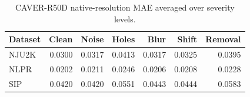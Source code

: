 \begin{table}[t]\centering\caption{CAVER-R50D native-resolution MAE averaged over severity levels.}\label{tab:caver_family_mae}\begin{tabular}{lrrrrrr}\toprule Dataset & Clean & Noise & Holes & Blur & Shift & Removal \\ \midrule
NJU2K & 0.0300 & 0.0317 & 0.0413 & 0.0317 & 0.0325 & 0.0395 \\
NLPR & 0.0202 & 0.0211 & 0.0246 & 0.0206 & 0.0208 & 0.0228 \\
SIP & 0.0420 & 0.0420 & 0.0551 & 0.0443 & 0.0444 & 0.0583 \\
\bottomrule\end{tabular}\end{table}
